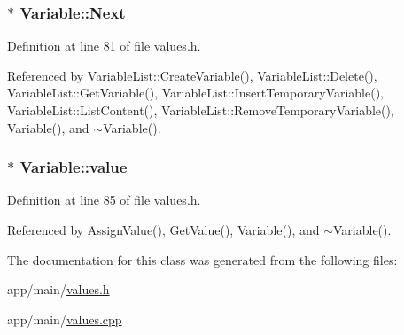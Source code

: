 \subsubsection[{\texorpdfstring{Next}{Next}}]{$\ast$ Variable\+::\+Next}\hypertarget{classVariable_ac5662d23fccccf25e3565793841ce580}{}\label{classVariable_ac5662d23fccccf25e3565793841ce580}


Definition at line 81 of file values.\+h.



Referenced by Variable\+List\+::\+Create\+Variable(), Variable\+List\+::\+Delete(), Variable\+List\+::\+Get\+Variable(), Variable\+List\+::\+Insert\+Temporary\+Variable(), Variable\+List\+::\+List\+Content(), Variable\+List\+::\+Remove\+Temporary\+Variable(), Variable(), and $\sim$\+Variable().

\subsubsection[{\texorpdfstring{value}{value}}]{$\ast$ Variable\+::value\hspace{0.3cm}{\ttfamily [private]}}\hypertarget{classVariable_a97f7747dc30797f29b247e26ca585c94}{}\label{classVariable_a97f7747dc30797f29b247e26ca585c94}


Definition at line 85 of file values.\+h.



Referenced by Assign\+Value(), Get\+Value(), Variable(), and $\sim$\+Variable().



The documentation for this class was generated from the following files\+:\begin{DoxyCompactItemize}
\item 
app/main/\hyperlink{values_8h}{values.\+h}\item 
app/main/\hyperlink{values_8cpp}{values.\+cpp}\end{DoxyCompactItemize}
